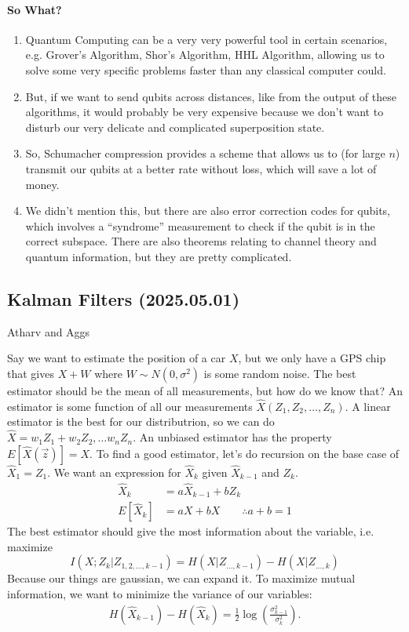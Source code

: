 \documentclass[12pt]{article}
\theoremstyle{remark}
\begin{document}
\paragraph{So What?}
    \begin{enumerate}
        \item Quantum Computing can be a very very powerful tool in certain scenarios, e.g. Grover's Algorithm, Shor's Algorithm, HHL Algorithm, allowing us to solve some very specific problems faster than any classical computer could.
        \item But, if we want to send qubits across distances, like from the output of these algorithms, it would probably be very expensive because we don't want to disturb our very delicate and complicated superposition state.
        \item So, Schumacher compression provides a scheme that allows us to (for large $n$) transmit our qubits at a better rate without loss, which will save a lot of money.
        \item We didn't mention this, but there are also error correction codes for qubits, which involves a ``syndrome'' measurement to check if the qubit is in the correct subspace. There are also theorems relating to channel theory and quantum information, but they are pretty complicated.
\end{enumerate}

\subsection{Kalman Filters (2025.05.01)}
Atharv and Aggs

Say we want to estimate the position of a car $X$, but we only have a GPS chip that gives $X+W$ where $W\sim N(0,\sigma^2)$ is some random noise. The best estimator should be the mean of all measurements, but how do we know that? An estimator is some function of all our measurements $\hat X(Z_1,Z_2,\dots,Z_n)$. A linear estimator is the best for our distributrion, so we can do $\hat X = w_1Z_1+w_2Z_2,\dots w_n Z_n.$ An unbiased estimator has the property $E[\hat X (\vec z)] = X$. To find a good estimator, let's do recursion on the base case of $\hat X_1 = Z_1$. We want an expression for $\hat X_k$ given $\hat X_{k-1}$ and $Z_k$. 
\begin{align*}
    \hat X_k &= a \hat X_{k-1} + b Z_k \\
    E[\hat X_k] &= a X + bX\qquad\therefore a+b=1
\end{align*}
The best estimator should give the most information about the variable, i.e. maximize \[I(X;Z_k|Z_{1,2,\dots,k-1})=H(X|Z_{\dots,k-1})-H(X|Z_{\dots,k})\]
Because our things are gaussian, we can expand it. To maximize mutual information, we want to minimize the variance of our variables:
\begin{align*}
    H(\hat X_{k-1}) - H(\hat X_k)=\frac{1}{2} \log \left(\frac{\sigma_{k-1}^2}{\sigma_k^2}\right).
\end{align*}
\end{document}
